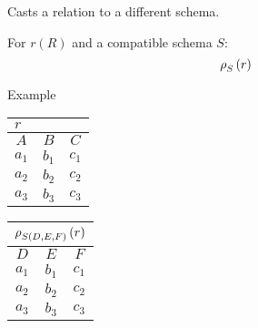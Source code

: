 \begin{multicols}{2}
\begin{CheatsheetEntryFrame}
    \end{CheatsheetEntryFrame}

    \begin{CheatsheetEntryFrame}


        Casts a relation to a different schema.

        For $r(R)$ and a compatible schema $S$:
        \begin{equation*}
            \operatorname{\rho}_{S}{(r)}
        \end{equation*}

        \SubsectionFrameRemoveSeparation
        \begin{RelAlgSubsection}{Example}
        \begin{center}
            {\footnotesize%
                \begin{tabular}{|ccc|}
                    \multicolumn{3}{l}{\normalsize $r$}
                        \\ \hline
                    \multicolumn{1}{|c}{$A$}
                        & \multicolumn{1}{c}{$B$}
                        & \multicolumn{1}{c|}{$C$}
                        \\ \hline\hline
                    $a_1$ & $b_1$ & $c_1$ \\
                    $a_2$ & $b_2$ & $c_2$ \\
                    $a_3$ & $b_3$ & $c_3$ \\ \hline
                \end{tabular}
                \qquad \qquad
                \begin{tabular}{|ccc|}
                    \multicolumn{3}{l}{\normalsize $\operatorname{\rho}_{S(D, E, F)}{(r)}$}
                        \\ \hline
                    \multicolumn{1}{|c}{$D$}
                        & \multicolumn{1}{c}{$E$}
                        & \multicolumn{1}{c|}{$F$}
                        \\ \hline\hline
                    $a_1$ & $b_1$ & $c_1$ \\
                    $a_2$ & $b_2$ & $c_2$ \\
                    $a_3$ & $b_3$ & $c_3$ \\ \hline
                \end{tabular}
            }
        \end{center}
        \end{RelAlgSubsection}


\end{CheatsheetEntryFrame}
\end{multicols}
